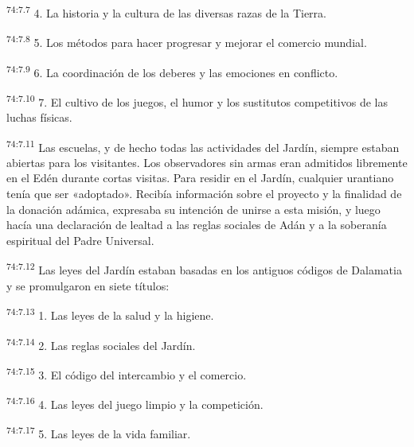 \par
\textsuperscript{74:7.7} 4. La historia y la cultura de las diversas razas de la Tierra.

\par
\textsuperscript{74:7.8} 5. Los métodos para hacer progresar y mejorar el comercio mundial.

\par
\textsuperscript{74:7.9} 6. La coordinación de los deberes y las emociones en conflicto.

\par
\textsuperscript{74:7.10} 7. El cultivo de los juegos, el humor y los sustitutos competitivos de las luchas físicas.

\par
\textsuperscript{74:7.11} Las escuelas, y de hecho todas las actividades del Jardín, siempre estaban abiertas para los visitantes. Los observadores sin armas eran admitidos libremente en el Edén durante cortas visitas. Para residir en el Jardín, cualquier urantiano tenía que ser «adoptado». Recibía información sobre el proyecto y la finalidad de la donación adámica, expresaba su intención de unirse a esta misión, y luego hacía una declaración de lealtad a las reglas sociales de Adán y a la soberanía espiritual del Padre Universal.

\par
\textsuperscript{74:7.12} Las leyes del Jardín estaban basadas en los antiguos códigos de Dalamatia y se promulgaron en siete títulos:

\par
\textsuperscript{74:7.13} 1. Las leyes de la salud y la higiene.

\par
\textsuperscript{74:7.14} 2. Las reglas sociales del Jardín.

\par
\textsuperscript{74:7.15} 3. El código del intercambio y el comercio.

\par
\textsuperscript{74:7.16} 4. Las leyes del juego limpio y la competición.

\par
\textsuperscript{74:7.17} 5. Las leyes de la vida familiar.

